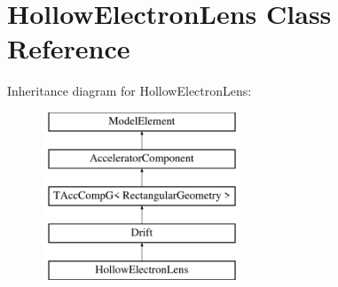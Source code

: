 \hypertarget{classHollowElectronLens}{}\section{Hollow\+Electron\+Lens Class Reference}
\label{classHollowElectronLens}
Inheritance diagram for Hollow\+Electron\+Lens\+:\begin{figure}[H]
\begin{center}
\leavevmode
\includegraphics[height=5.000000cm]{classHollowElectronLens}
\end{center}
\end{figure}
